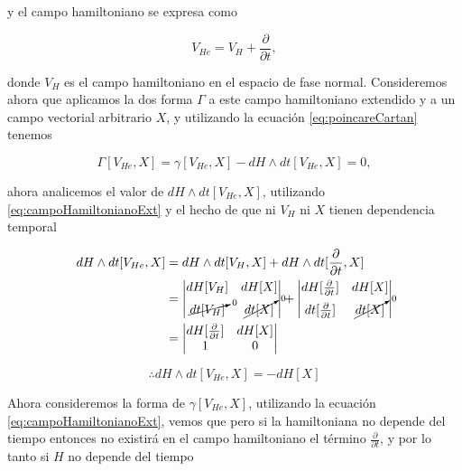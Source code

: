 \documentclass[a4paper,10pt]{article}
\numberwithin{equation}{section}
\begin{document}
y el campo hamiltoniano se expresa como 

\begin{equation}
 V_{He} = V_H + \frac{\partial}{\partial t},
 \label{eq:campoHamiltonianoExt}
\end{equation}

donde $V_H$ es el campo hamiltoniano en el espacio de fase normal. Consideremos ahora 
que aplicamos la dos forma $\Gamma$ a este campo hamiltoniano extendido y a un campo 
vectorial arbitrario $X$, y utilizando la ecuación \eqref{eq:poincareCartan} tenemos 

\begin{equation}
 \Gamma[V_{He},X] = \gamma[V_{He},X] - dH \wedge dt[V_{He},X] = 0,
 \label{eq:equivalencia}
\end{equation}

ahora analicemos el valor de $dH \wedge dt[V_{He},X]$, utilizando \eqref{eq:campoHamiltonianoExt}
y el hecho de que ni $V_H$ ni $X$ tienen dependencia temporal

\begin{align*}
  dH \wedge dt[V_{He},X] &= dH \wedge dt[V_H,X] + dH \wedge dt[\frac{\partial}{\partial t},X] \\
  &= \left|\begin{matrix}
       dH[V_H] & dH[X] \\
       \cancelto{0}{dt[V_H]} & \cancelto{0}{dt[X]}
      \end{matrix}
      \right| + 
      \left|\begin{matrix}
       dH[\frac{\partial}{\partial t}] & dH[X] \\
       dt[\frac{\partial}{\partial t}] & \cancelto{0}{dt[X]}
      \end{matrix}
      \right| \\
  &= \left|\begin{matrix}
       dH[\frac{\partial}{\partial t}] & dH[X] \\
       1 & 0
      \end{matrix}
      \right|
\end{align*}

\begin{equation}
 \therefore dH \wedge dt[V_{He},X] = - dH[X]
\end{equation}

Ahora consideremos la forma de $\gamma[V_{He},X]$, utilizando la ecuación \eqref{eq:campoHamiltonianoExt}, 
vemos que pero si la hamiltoniana no depende del tiempo entonces no existirá en el campo hamiltoniano el 
término $\frac{\partial}{\partial t}$, y por lo tanto si $H$ no depende 
del tiempo
\end{document}
